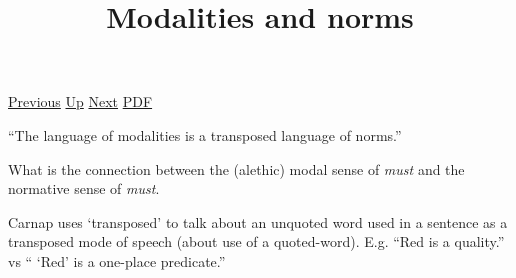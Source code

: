 \documentclass[12pt,a4paper]{report}
\begin{document}
 \href{doc/phil/People/Sellars/Quotes/Modalexpressionsasexplanations.html}{Previous} 
 \href{doc/phil/People/Sellars/Quotes.html}{Up} 
 \href{doc/phil/People/Sellars/Quotes/Nondescriptiveconcepts.html}{Next} 
 \href{doc/phil/People/Sellars/Quotes/Modalitiesandnorms.pdf}{PDF} 
\title{Modalities and norms}
``The language of modalities is a transposed language of norms.''


What is the connection between the (alethic) modal sense of \emph{must} and the
 normative sense of \emph{must}.

Carnap uses `transposed' to talk about an unquoted word used in a sentence as a
transposed mode of speech (about use of a quoted-word). E.g. ``Red is a
quality.'' vs `` `Red' is a one-place predicate.''
\end{document}
